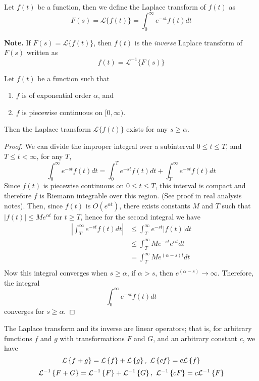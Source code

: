 \documentclass[openany]{report}
\begin{document}
\begin{definition}
    Let $f(t)$ be a function, then we define the Laplace transform of $f(t)$ as 
    \[F(s) = \mathcal{L}\{f(t)\} = \int_{0}^\infty e^{-st}f(t)dt\]
\end{definition}
\noindent
\textbf{Note.} If $F(s) = \mathcal{L}\{f(t)\}$, then $f(t)$ is the \emph{inverse} Laplace transform of $F(s)$ written as 
\[f(t) = \mathcal{L}^{-1}\{F(s)\}\]
\begin{theorem}
    Let $f(t)$ be a function such that 
    \begin{enumerate}[label=(\roman*)]
        \item $f$ is of exponential order $\alpha$, and 
        \item $f$ is piecewise continuous on $[0, \infty)$. 
    \end{enumerate}
    Then the Laplace transform $\mathcal{L}\{f(t)\}$ exists for any $s \geq \alpha$. 
\end{theorem}
\begin{proof}
    We can divide the improper integral over a subinterval $0 \leq t \leq T$, and $T \leq t < \infty$, for any $T$, 
    \[\int_0^\infty e^{-st}f(t)dt = \int_0^T e^{-st}f(t)dt + \int_T^\infty e^{-st}f(t)dt\]
    Since $f(t)$ is piecewise continuous on $0 \leq t \leq T$, this interval is compact and therefore $f$ is Riemann integrable over this region. (See proof in real analysis notes). Then, since $f(t)$ is $O(e^{\alpha t})$, there exists constants $M$ and $T$ such that $|f(t)| \leq Me^{\alpha t}$ for $t \geq T$, hence for the second integral we have  
    \begin{align*}
        \left|\int_T^\infty e^{-st}f(t)dt\right| &\leq \int_T^\infty e^{-st}|f(t)|dt\\
        &\leq \int_T^\infty Me^{-st}e^{\alpha t}dt\\
        &= \int_T^\infty Me^{(\alpha - s)t}dt\\
    \end{align*}
    Now this integral converges when $s \geq \alpha$, if $\alpha > s$, then $e^{(\alpha - s)} \rightarrow \infty$. Therefore, the integral 
    \[\int_0^\infty e^{-st}f(t)dt\]
    converges for $s \geq \alpha$.
\end{proof}

\begin{theorem}
    The Laplace transform and its inverse are linear operators; that is, for arbitrary functions $f$ and $g$ with transformations $F$ and $G$, and an arbitrary constant $c$, we have 
    \[\mathcal{L}\left\{f+g\right\} = \mathcal{L}\left\{f\right\} + \mathcal{L}\left\{g\right\}, \ \mathcal{L}\left\{cf\right\} = c\mathcal{L}\left\{f\right\}\]
    \[\ilaplace{F+G} = \ilaplace{F} + \ilaplace{G}, \ \ilaplace{cF} = c\ilaplace{F}\]
\end{theorem}
\end{document}
